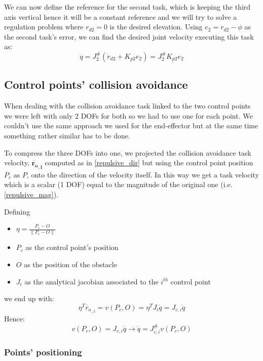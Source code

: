 \documentclass[12pt, a4paper]{article}
\newcommand{\norm}[1]{\parallel{#1}\parallel}
\begin{document}
We can now define the reference for the second task, which is keeping the third axis vertical hence it will be a constant reference and we will try to solve a regulation problem where $r_{d2} = 0$ is the desired elevation. Using $e_2 = r_{d2} - \phi$ as the second task's error, we can find the desired joint velocity executing this task as:
\begin{equation}
\dot{q} = J_2^{\#}(\dot{r}_{d2} + K_{p2}e_2)=J_2^{\#}K_{p2}e_2
\end{equation}
\subsection[Tasks 3 \& 4]{Control points' collision avoidance}
When dealing with the collision avoidance task linked to the two control points we were left with only 2 DOFs for both so we had to use one for each point. We couldn't use the same approach we used for the end-effector but at the same time something rather similar has to be done. 

To compress the three DOFs into one, we projected the collision avoidance task velocity, $\mathbf{\dot{r_{o}}_{,i}}$ computed as in \eqref{repulsive_dir} but using the control point position $P_c$ as $P$, onto the direction of the velocity itself. In this way we get a task velocity which is a scalar (1 DOF) equal to the magnitude of the original one (i.e. \eqref{repulsive_mag}).

Defining 
\begin{itemize}
	\item $\eta = \frac{P_c - O}{\norm{P_c-O}}$
	\item $P_c$ as the control point's position
	\item $O$ as the position of the obstacle
	\item $J_i$ as the analytical jacobian associated to the $i^{th}$ control point
\end{itemize}
we end up with:
\begin{equation*}
\eta^T\dot{r_{o}}_{,i} = v(P_c,O) =\eta^T J_i\dot{q} = J_{c,i}\dot{q}
\end{equation*}
Hence:
\begin{equation}
v(P_c,O) = J_{c,i}\dot{q} \rightarrow \dot{q} = J_{c,i}^{\#}v(P_c,O)
\end{equation}

\subsubsection{Points' positioning}
\end{document}

